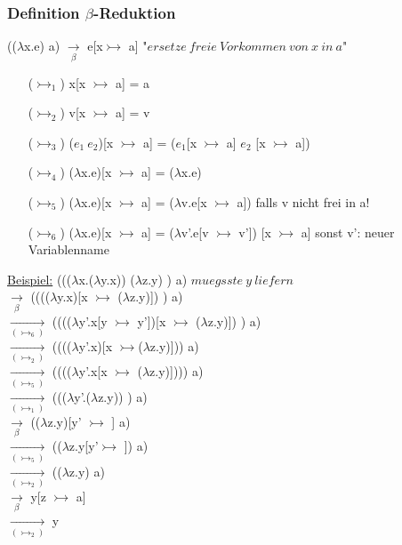 \documentclass[a4paper,12pt]{article}
\begin{document}
\subsubsection{Definition $\beta$-Reduktion}
(($\lambda$x.e) a) $\underset{\beta}{\rightarrow}$ e[x$\rightarrowtail$ a] "$ersetze\ freie\ Vorkommen\ von\ x\ in\ a$"\\
\begin{itemize}
\item[($\rightarrowtail_1$)] x[x $\rightarrowtail$ a] = a
\item[($\rightarrowtail_2$)] v[x $\rightarrowtail$ a] = v
\item[($\rightarrowtail_3$)] ($e_1\ e_2$)[x $\rightarrowtail$ a] = ($e_1$[x $\rightarrowtail$ a] $e_2$ [x $\rightarrowtail$ a])
\item[($\rightarrowtail_4$)] ($\lambda$x.e)[x $\rightarrowtail$ a] = ($\lambda$x.e)
\item[($\rightarrowtail_5$)] %
							($\lambda$x.e)[x $\rightarrowtail$ a] = ($\lambda$v.e[x $\rightarrowtail$ a]) falls v nicht frei in a!
\item[($\rightarrowtail_6$)] ($\lambda$x.e)[x $\rightarrowtail$ a] = ($\lambda$v'.e[v $\rightarrowtail$ v']) [x $\rightarrowtail$ a] sonst v': neuer Variablenname
\end{itemize}
\uline{Beispiel:}
((($\lambda$x.($\lambda$y.x)) ($\lambda$z.y) \maltese) a) $muegsste\ y\ liefern$\\
$\underset{\beta}{\rightarrow}$ (((($\lambda$y.x)[x $\rightarrowtail$ ($\lambda$z.y)]) \maltese) a)\\
$\underset{(\rightarrowtail_6)}{\rightarrow}$ (((($\lambda$y'.x[y $\rightarrowtail$ y'])[x $\rightarrowtail$ ($\lambda$z.y)]) \maltese) a)\\
$\underset{(\rightarrowtail_2)}{\rightarrow}$ (((($\lambda$y'.x)[x $\rightarrowtail$($\lambda$z.y)])\maltese) a)\\
$\underset{(\rightarrowtail_5)}{\rightarrow}$ (((($\lambda$y'.x[x $\rightarrowtail$ ($\lambda$z.y)]))\maltese) a)\\
$\underset{(\rightarrowtail_1)}{\rightarrow}$ ((($\lambda$y'.($\lambda$z.y)) \maltese) a)\\
$\underset{\beta}{\rightarrow}$ (($\lambda$z.y)[y' $\rightarrowtail$ \maltese] a)\\
$\underset{(\rightarrowtail_5)}{\rightarrow}$ (($\lambda$z.y[y'$\rightarrowtail$ \maltese]) a)\\
$\underset{(\rightarrowtail_2)}{\rightarrow}$ (($\lambda$z.y) a)\\
$\underset{\beta}{\rightarrow}$ y[z $\rightarrowtail$ a]\\
$\underset{(\rightarrowtail_2)}{\rightarrow}$ y
\end{document}

